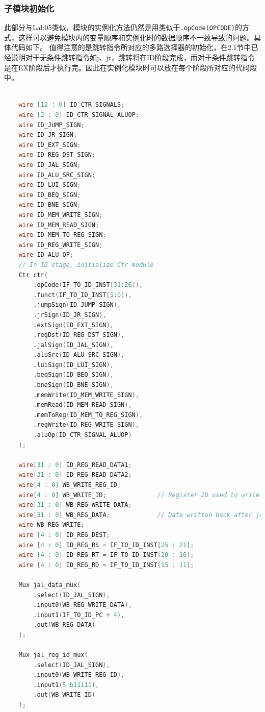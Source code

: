 \subsubsection{子模块初始化}
此部分与Lab05类似，模块的实例化方法仍然是用类似于\texttt{.opCode(OPCODE)}的方式，这样可以避免模块内的变量顺序和实例化时的数据顺序不一致导致的问题。具体代码如下。
值得注意的是跳转指令所对应的多路选择器的初始化，在2.1节中已经说明对于无条件跳转指令如j、jr，跳转将在ID阶段完成，而对于条件跳转指令是在EX阶段后才执行完。因此在实例化模块时可以放在每个阶段所对应的代码段中。
\begin{lstlisting}[language=Verilog]

    wire [12 : 0] ID_CTR_SIGNALS;
    wire [2 : 0] ID_CTR_SIGNAL_ALUOP;
    wire ID_JUMP_SIGN;
    wire ID_JR_SIGN;
    wire ID_EXT_SIGN;
    wire ID_REG_DST_SIGN;
    wire ID_JAL_SIGN;
    wire ID_ALU_SRC_SIGN;
    wire ID_LUI_SIGN;
    wire ID_BEQ_SIGN;
    wire ID_BNE_SIGN;
    wire ID_MEM_WRITE_SIGN;
    wire ID_MEM_READ_SIGN;
    wire ID_MEM_TO_REG_SIGN;
    wire ID_REG_WRITE_SIGN;
    wire ID_ALU_OP;
    // In ID stage, initialize Ctr module
    Ctr ctr(
        .opCode(IF_TO_ID_INST[31:26]),
        .funct(IF_TO_ID_INST[5:0]),
        .jumpSign(ID_JUMP_SIGN),
        .jrSign(ID_JR_SIGN),
        .extSign(ID_EXT_SIGN),
        .regDst(ID_REG_DST_SIGN),
        .jalSign(ID_JAL_SIGN),
        .aluSrc(ID_ALU_SRC_SIGN),
        .luiSign(ID_LUI_SIGN),
        .beqSign(ID_BEQ_SIGN),
        .bneSign(ID_BNE_SIGN),
        .memWrite(ID_MEM_WRITE_SIGN),
        .memRead(ID_MEM_READ_SIGN),
        .memToReg(ID_MEM_TO_REG_SIGN),
        .regWrite(ID_REG_WRITE_SIGN),
        .aluOp(ID_CTR_SIGNAL_ALUOP)
    );

    wire[31 : 0] ID_REG_READ_DATA1;                     
    wire[31 : 0] ID_REG_READ_DATA2;                 
    wire[4 : 0] WB_WRITE_REG_ID;         
    wire[4 : 0] WB_WRITE_ID;              // Register ID used to write back after jal mux
    wire[31 : 0] WB_REG_WRITE_DATA;       
    wire[31 : 0] WB_REG_DATA;             // Data written back after jal mux
    wire WB_REG_WRITE;          
    wire [4 : 0] ID_REG_DEST;
    wire [4 : 0] ID_REG_RS = IF_TO_ID_INST[25 : 21];
    wire [4 : 0] ID_REG_RT = IF_TO_ID_INST[20 : 16];
    wire [4 : 0] ID_REG_RD = IF_TO_ID_INST[15 : 11];

    Mux jal_data_mux(
        .select(ID_JAL_SIGN),
        .input0(WB_REG_WRITE_DATA),
        .input1(IF_TO_ID_PC + 4),
        .out(WB_REG_DATA)
    );

    Mux jal_reg_id_mux(
        .select(ID_JAL_SIGN),
        .input0(WB_WRITE_REG_ID),
        .input1(5'b11111),
        .out(WB_WRITE_ID)
    );
    

\end{lstlisting}
